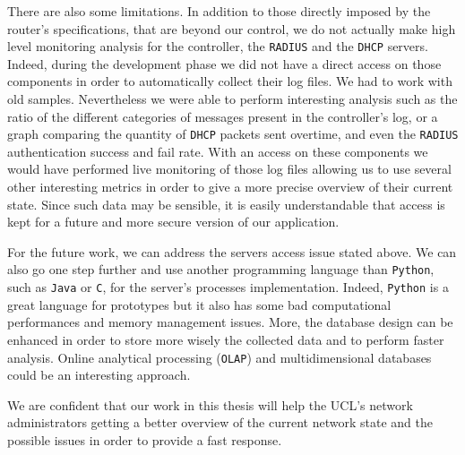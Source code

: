 There are also some limitations. In addition to those directly imposed by the router's specifications, that are beyond our control, we do not actually make high level monitoring analysis for the controller, the \texttt{RADIUS} and the \texttt{DHCP} servers. Indeed, during the development phase we did not have a direct access on those components in order to automatically collect their log files. We had to work with old samples. Nevertheless we were able to perform interesting analysis such as the ratio of the different categories of messages present in the controller's log, or a graph comparing the quantity of \texttt{DHCP} packets sent overtime, and even the \texttt{RADIUS} authentication success and fail rate. With an access on these components we would have performed live monitoring of those log files allowing us to use several other interesting metrics in order to give a more precise overview of their current state. Since such data may be sensible, it is easily understandable that access is kept for a future and more secure version of our application. 

For the future work, we can address the servers access issue stated above. We can also go one step further and use another programming language than \texttt{Python}, such as \texttt{Java} or \texttt{C}, for the server's processes implementation. Indeed, \texttt{Python} is a great language for prototypes but it also has some bad computational performances and memory management issues. More, the database design can be enhanced in order to store more wisely the collected data and to perform faster analysis. Online analytical processing (\texttt{OLAP}) and multidimensional databases could be an interesting approach. 

We are confident that our work in this thesis will help the UCL's network administrators getting a better overview of the current network state and the possible issues in order to provide a fast response.



